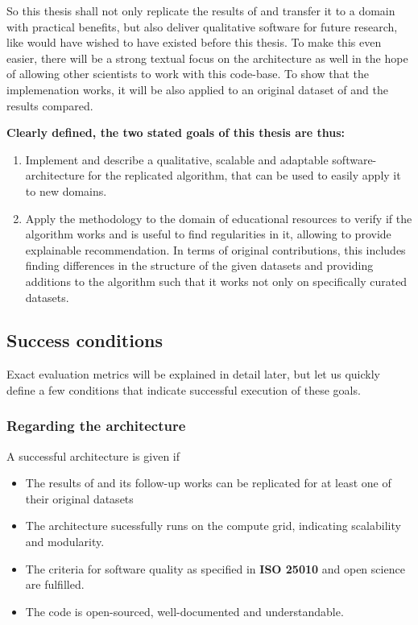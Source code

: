 So this thesis shall not only replicate the results of \cite{Derrac2015} and transfer it to a domain with practical benefits, but also deliver qualitative software for future research, like \me would have wished to have existed before this thesis. To make this even easier, there will be a strong textual focus on the architecture as well in the hope of allowing other scientists to work with this code-base. To show that the implemenation works, it will be also applied to an original dataset of \cite{Derrac2015} and the results compared.

\textbf{Clearly defined, the two stated goals of this thesis are thus:}

\begin{enumerate}
	\item Implement and describe a qualitative, scalable and adaptable software-architecture for the replicated algorithm, that can be used to easily apply it to new domains.
	\item Apply the methodology to the domain of educational resources to verify if the algorithm works and is useful to find regularities in it, allowing to
	provide explainable recommendation. In terms of original contributions, this includes finding differences in the structure of the given datasets and providing additions to the algorithm such that it works not only on specifically curated datasets.
\end{enumerate}

\subsection{Success conditions}

Exact evaluation metrics will be explained in detail later, but let us quickly define a few conditions that indicate successful execution of these goals.

\subsubsection*{Regarding the architecture}

A successful architecture is given if 

\begin{itemize}
	\item The results of \cite{Derrac2015} and its follow-up works \cite{Ager2018,Alshaikh2020} can be replicated for at least one of their original datasets
	\item The architecture sucessfully runs on the compute grid, indicating scalability and modularity.
	\item The criteria for software quality as specified in \textbf{ISO 25010} and open science are fulfilled.
	\item The code is open-sourced, well-documented and understandable.
\end{itemize}

